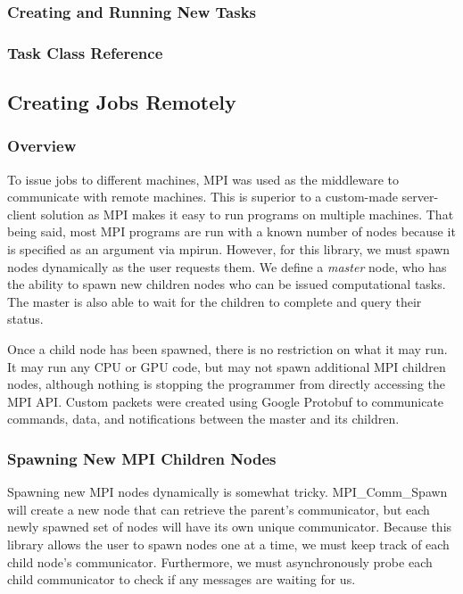 \documentclass[11pt]{article}
\begin{document}
			\subsubsection{Creating and Running New Tasks}
			
			\subsubsection{Task Class Reference}
			
			
		\subsection{Creating Jobs Remotely}
			\subsubsection{Overview}	
				To issue jobs to different machines, MPI was used as the middleware to communicate with remote machines.
				This is superior to a custom-made server-client solution as MPI makes it easy to run programs on multiple machines.
				That being said, most MPI programs are run with a known number of nodes because it is specified as an argument via
				mpirun. However, for this library, we must spawn nodes dynamically as the user requests them. We define a
				\textit{master} node, who has the ability to spawn new children nodes who can be issued computational tasks. The
				master is also able to wait for the children to complete and query their status. 
				
				Once a child node has been spawned, there is no restriction on what it may run. It may run any CPU or GPU code, but
				may not spawn additional MPI children nodes, although nothing is stopping the programmer from directly accessing the 
				MPI API. Custom packets were created using Google Protobuf to communicate commands, data, and notifications between the
				master and its children.
				 
			\subsubsection{Spawning New MPI Children Nodes}
				Spawning new MPI nodes dynamically is somewhat tricky. MPI\_Comm\_Spawn will create a new node that can retrieve the
				parent's communicator, but each newly spawned set of nodes will have its own unique communicator. Because this library
				allows the user to spawn nodes one at a time, we must keep track of each child node's communicator. Furthermore, we 
				must asynchronously probe each child communicator to check if any messages are waiting for us.
			
\end{document}
